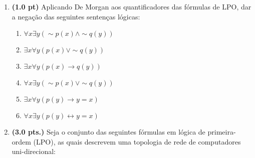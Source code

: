 \documentclass[a4paper,11pt]{article}
\begin{document}
\begin{enumerate}

\item {\bf (1.0 pt)} Aplicando De Morgan aos
quantificadores das fórmulas de LPO, dar a
negação das seguintes sentenças lógicas:
\begin{enumerate}
\setlength{\itemsep}{-2pt}
 \item $ \forall x \exists y (\sim p(x) \wedge \sim q(y))$
 \item $ \exists x \forall y (p(x) \vee \sim q(y))$
 \item $ \exists x \forall y (p(x)\rightarrow q(y))$
 \item $ \forall x \exists y (\sim p(x) \vee \sim q(y))$
  \item  $ \exists x \forall y (p(y) \rightarrow y = x)$
  \item  $ \forall x \exists y (p(y) \leftrightarrow y = x)$
\end{enumerate}

\item {\bf (3.0 pts.)} Seja o conjunto das seguintes fórmulas em lógica de primeira-ordem (LPO), as quais
descrevem uma topologia de rede de computadores uni-direcional:\\


\end{enumerate}
\end{document}

